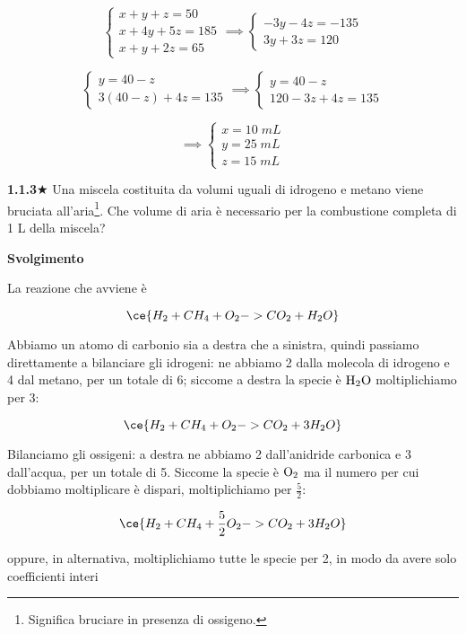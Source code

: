 $$\begin{cases}
    x+y+z=50\\
    x + 4y + 5z=185\\
    x+y+2z=65
\end{cases}
\implies
\begin{cases}
    -3y-4z=-135\\
    3y+3z=120
\end{cases}$$

$$\begin{cases}
    y=40-z\\
    3(40-z) + 4z=135
\end{cases}
\implies
\begin{cases}
    y=40-z\\
    120 - 3z + 4z=135
\end{cases}$$

$$\implies
\begin{cases}
    x=10\;mL\\
    y=25\;mL\\
    z=15\;mL
\end{cases}$$

\vspace{0.2cm}\textbf{1.1.3}$\bigstar$ Una miscela costituita da volumi uguali di idrogeno e metano viene bruciata all'aria\footnote{Significa bruciare in presenza di ossigeno.}. Che volume di aria è necessario per la combustione completa di 1 L della miscela?

\vspace{0.2cm}\large\textbf{Svolgimento}\normalsize

\vspace{0.2cm}La reazione che avviene è

$$\ce{H_2 + CH_4 + O_2 -> CO_2 + H_2O}$$

Abbiamo un atomo di carbonio sia a destra che a sinistra, quindi passiamo direttamente a bilanciare gli idrogeni: ne abbiamo 2 dalla molecola di idrogeno e 4 dal metano, per un totale di 6; siccome a destra la specie è $\rm H_2O$ moltiplichiamo per 3:

$$\ce{H_2 + CH_4 + O_2 -> CO_2 + 3H_2O}$$

Bilanciamo gli ossigeni: a destra ne abbiamo 2 dall'anidride carbonica e 3 dall'acqua, per un totale di 5. Siccome la specie è $\rm O_2$ ma il numero per cui dobbiamo moltiplicare è dispari, moltiplichiamo per $\frac{5}{2}$:

$$\ce{H_2 + CH_4 + \frac{5}{2}O_2 -> CO_2 + 3H_2O}$$

oppure, in alternativa, moltiplichiamo tutte le specie per 2, in modo da avere solo coefficienti interi

